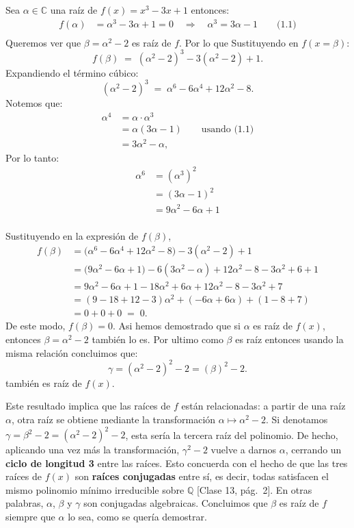 \begin{solucion}
 Sea $\alpha\in\mathbb{C}$ una raíz de $f(x)=x^{3}-3x+1$ entonces:
 \begin{align*}
    f(\alpha)&=\alpha^{3}-3\alpha+1=0 \quad \Rightarrow \quad \alpha^{3}=3\alpha-1 \qquad \text{(1.1)}\\
 \end{align*}
Queremos ver que $\beta=\alpha^{2}-2$ es raíz de $f$. Por lo que Sustituyendo en $f(x=\beta)$: 
\[
f(\beta)\;=\;(\alpha^{2}-2)^{3}-3(\alpha^{2}-2)+1.
\]
Expandiendo el término cúbico:
\[
(\alpha^{2}-2)^{3}\;=\;\alpha^{6}-6\alpha^{4}+12\alpha^{2}-8.
\]
Notemos que:
\begin{align*}
    \alpha^{4}&=\alpha\cdot\alpha^{3}\\
    &=\alpha(3\alpha-1) \qquad \text{usando (1.1)}\\
    &=3\alpha^{2}-\alpha,
\end{align*}
Por lo tanto:
\begin{align*}
    \alpha^{6}&=(\alpha^{3})^{2}\\
    &=(3\alpha-1)^{2}\\
    &=9\alpha^{2}-6\alpha+1\\
\end{align*}

Sustituyendo en la expresión de $f(\beta)$,
\begin{align*}
f(\beta)
  &=\bigl(\alpha^{6}-6\alpha^{4}+12\alpha^{2}-8\bigr)-3(\alpha^{2}-2)+1\\
  &=\bigl(9\alpha^{2}-6\alpha+1\bigr)-6(3\alpha^{2}-\alpha)
     +12\alpha^{2}-8-3\alpha^{2}+6+1\\
  &=9\alpha^{2}-6\alpha+1-18\alpha^{2}+6\alpha
     +12\alpha^{2}-8-3\alpha^{2}+7\\
  &=(9-18+12-3)\alpha^{2}+(-6\alpha+6\alpha)+(1-8+7)\\
  &=0+0+0 \;=\;0.
\end{align*}
De este modo, $f(\beta)=0$. Asi hemos demostrado que si $\alpha$ es raíz de $f(x)$, entonces
$\beta=\alpha^{2}-2$ también lo es. Por ultimo como $\beta$ es raíz entonces usando la misma relación concluimos que:
\[
\gamma=(\alpha^{2}-2)^{2}-2=(\beta)^{2}-2.
\]
también es raíz de $f(x)$.


Este resultado implica que las raíces de $f$ están relacionadas: a partir de una raíz $\alpha$,  
otra raíz se obtiene mediante la transformación $\alpha \mapsto \alpha^{2}-2$.  
Si denotamos $\gamma=\beta^{2}-2=(\alpha^{2}-2)^{2}-2$, esta sería la tercera raíz del polinomio.  
De hecho, aplicando una vez más la transformación, $\gamma^{2}-2$ vuelve a darnos $\alpha$,  
cerrando un \textbf{ciclo de longitud 3} entre las raíces.  
Esto concuerda con el hecho de que las tres raíces de $f(x)$ son \textbf{raíces conjugadas} entre sí,  
es decir, todas satisfacen el mismo polinomio mínimo irreducible sobre $\mathbb{Q}$  
[Clase 13, pág.\ 2].  
En otras palabras, $\alpha$, $\beta$ y $\gamma$ son conjugadas algebraicas.  
Concluimos que $\beta$ es raíz de $f$ siempre que $\alpha$ lo sea, como se quería demostrar.



\end{solucion}
